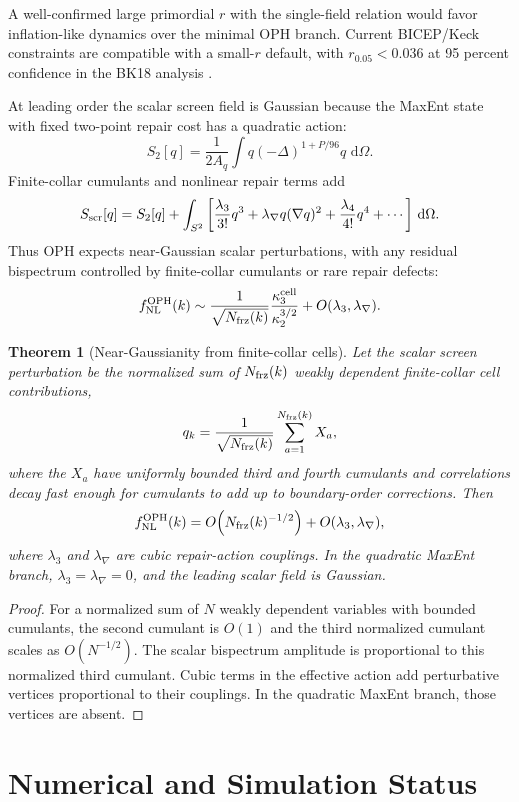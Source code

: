 \documentclass[11pt]{article}
\newtheorem{theorem}{Theorem}[section]
\newcommand{\OPH}{\mathrm{OPH}}
\newcommand{\dd}{\,\mathrm d}
\begin{document}
A well-confirmed large primordial \(r\) with the single-field relation would favor inflation-like
dynamics over the minimal OPH branch. Current BICEP/Keck constraints are compatible with a small-\(r\)
default, with \(r_{0.05}<0.036\) at 95 percent confidence in the BK18 analysis \cite{bicepkeck2021}.

At leading order the scalar screen field is Gaussian because the MaxEnt state with fixed two-point
repair cost has a quadratic action:
\[
S_2[q]=
\frac{1}{2A_q}\int q(-\Delta)^{1+P/96}q\,\dd\Omega .
\]
Finite-collar cumulants and nonlinear repair terms add
\[
S_{\rm scr}[q]=S_2[q]
+
\int_{S^2}
\left[
\frac{\lambda_3}{3!}q^3
+\lambda_\nabla q(\nabla q)^2
+\frac{\lambda_4}{4!}q^4+\cdots
\right]\dd\Omega.
\]
Thus OPH expects near-Gaussian scalar perturbations, with any residual bispectrum controlled by
finite-collar cumulants or rare repair defects:
\[
f_{\rm NL}^{\OPH}(k)
\sim
\frac{1}{\sqrt{N_{\rm frz}(k)}}
\frac{\kappa_3^{\rm cell}}{\kappa_2^{3/2}}
+O(\lambda_3,\lambda_\nabla).
\]

\begin{theorem}[Near-Gaussianity from finite-collar cells]\label{thm:near-gaussianity}
Let the scalar screen perturbation be the normalized sum of \(N_{\rm frz}(k)\) weakly dependent
finite-collar cell contributions,
\[
q_k
=
\frac{1}{\sqrt{N_{\rm frz}(k)}}
\sum_{a=1}^{N_{\rm frz}(k)}X_a,
\]
where the \(X_a\) have uniformly bounded third and fourth cumulants and correlations decay fast
enough for cumulants to add up to boundary-order corrections. Then
\[
f_{\rm NL}^{\OPH}(k)
=
O\!\left(N_{\rm frz}(k)^{-1/2}\right)
+
O(\lambda_3,\lambda_\nabla),
\]
where \(\lambda_3\) and \(\lambda_\nabla\) are cubic repair-action couplings. In the quadratic MaxEnt
branch, \(\lambda_3=\lambda_\nabla=0\), and the leading scalar field is Gaussian.
\end{theorem}

\begin{proof}
For a normalized sum of \(N\) weakly dependent variables with bounded cumulants, the second cumulant
is \(O(1)\) and the third normalized cumulant scales as \(O(N^{-1/2})\). The scalar bispectrum
amplitude is proportional to this normalized third cumulant. Cubic terms in the effective action add
perturbative vertices proportional to their couplings. In the quadratic MaxEnt branch, those vertices
are absent.
\end{proof}

\section{Numerical and Simulation Status}
\end{document}
